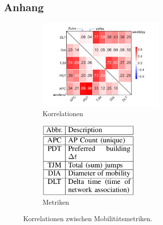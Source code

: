 \documentclass[12pt, a4paper]{article}
\begin{document}
\begin{appendix}
\section*{Anhang}

\begin{figure}[H]
    \centering
    \begin{subfigure}[b]{0.45\textwidth}
        \includegraphics[width=0.7\textwidth]{img/mobility_correlations.png}
        \caption{Korrelationen \cite{Alipour2018}}
    \end{subfigure}
    \hfill
    \begin{subfigure}[b]{0.45\textwidth}
        \includegraphics[width=0.55\textwidth]{img/mobility_metrics.png}
        \caption{Metriken \cite{Alipour2018}}
    \end{subfigure}
    \caption{Korrelationen zwischen Mobilitätsmetriken.}
    \label{fig:mobility_correlations}
\end{figure}


\end{appendix}
\end{document}
